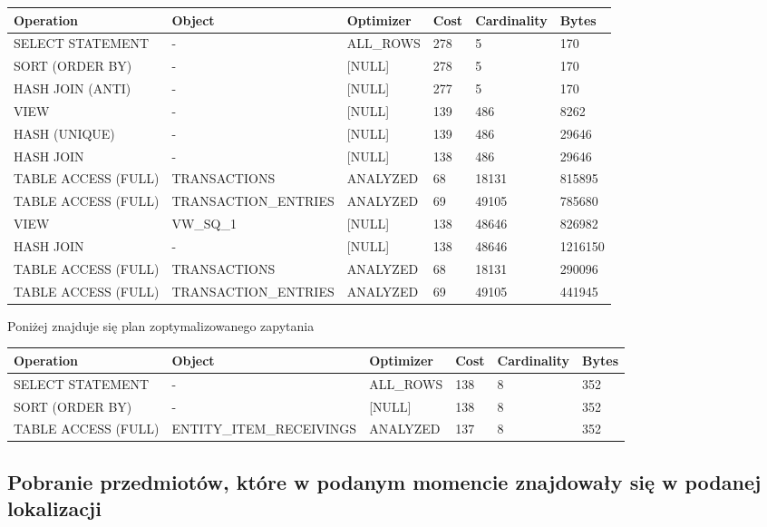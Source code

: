\documentclass[11pt]{article}
\numberwithin{figure}{subsection}
\begin{document}
		\begin{tabularx}{\textwidth}{|X|X|X|X|X|X|}
Operation&Object&Optimizer&Cost&Cardinality&Bytes\\ \hline
SELECT STATEMENT& - &ALL\_ROWS&278&5&170\\ \hline
SORT (ORDER BY)& - &[NULL]&278&5&170\\ \hline
HASH JOIN (ANTI)& - &[NULL]&277&5&170\\ \hline
VIEW& - &[NULL]&139&486&8262\\ \hline
HASH (UNIQUE)& - &[NULL]&139&486&29646\\ \hline
HASH JOIN& - &[NULL]&138&486&29646\\ \hline
TABLE ACCESS (FULL)&TRANSACTIONS&ANALYZED&68&18131&815895\\ \hline
TABLE ACCESS (FULL)&TRANSACTION\_ENTRIES&ANALYZED&69&49105&785680\\ \hline
VIEW&VW\_SQ\_1&[NULL]&138&48646&826982\\ \hline
HASH JOIN& - &[NULL]&138&48646&1216150\\ \hline
TABLE ACCESS (FULL)&TRANSACTIONS&ANALYZED&68&18131&290096\\ \hline
TABLE ACCESS (FULL)&TRANSACTION\_ENTRIES&ANALYZED&69&49105&441945\\ \hline
		\end{tabularx}
		
		Poniżej znajduje się plan zoptymalizowanego zapytania \\
		
		\begin{tabularx}{\textwidth}{|X|X|X|X|X|X|}
Operation&Object&Optimizer&Cost&Cardinality&Bytes\\ \hline
SELECT STATEMENT& - &ALL\_ROWS&138&8&352\\ \hline
SORT (ORDER BY)& - &[NULL]&138&8&352\\ \hline
TABLE ACCESS (FULL)&ENTITY\_ITEM\_RECEIVINGS&ANALYZED&137&8&352\\ \hline
		\end{tabularx}
		
		
		
		
		
		
		
		
		
		
		
		
		
	
	\subsection{Pobranie przedmiotów, które w podanym momencie znajdowały się w
	podanej lokalizacji}
	
\end{document}
